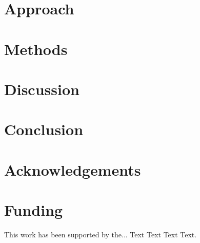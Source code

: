 \documentclass{bioinfo}
\begin{document}
\section{Approach}


\section{Methods}



\section{Discussion}







%
%






\section{Conclusion}

\vspace*{-10pt}


\section*{Acknowledgements}

\vspace*{-12pt}

\section*{Funding}

This work has been supported by the... Text Text  Text Text.\vspace*{-12pt}

%
%
%
%
%
%
%
%

\end{document}
